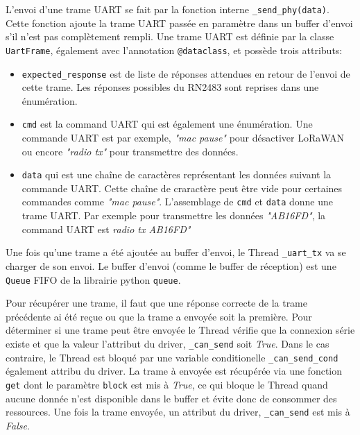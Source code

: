     L'envoi d'une trame UART se fait par la fonction interne \texttt{\_send\_phy(data)}. Cette fonction ajoute la trame UART passée en paramètre dans un buffer d'envoi s'il n'est pas complètement rempli. 
    Une trame UART est définie par la classe \texttt{UartFrame}, également avec l'annotation \texttt{@dataclass}, et possède trois attributs:
    \begin{itemize}
        \item \texttt{expected\_response} est de liste de réponses attendues en retour de l'envoi de cette trame. Les réponses possibles du RN2483 sont reprises dans une énumération. 
        \item \texttt{cmd} est la command UART qui est également une énumération. Une commande UART est par exemple, \textit{"mac pause"} pour désactiver LoRaWAN ou encore \textit{"radio tx"} pour transmettre des données.
        \item \texttt{data} qui est une chaîne de caractères représentant les données suivant la commande UART. Cette chaîne de craractère peut être vide pour certaines commandes comme \textit{"mac pause"}.
        L'assemblage de \texttt{cmd} et \texttt{data} donne une trame UART. Par exemple pour transmettre les données \textit{"AB16FD"}, la command UART est \textit{radio tx AB16FD"}
    \end{itemize}
    \vspace{0.5cm}

    Une fois qu'une trame a été ajoutée au buffer d'envoi, le Thread \texttt{\_uart\_tx} va se charger de 
    son envoi. Le buffer d'envoi (comme le buffer de réception) est une \texttt{Queue} FIFO de la librairie python \texttt{queue}.
    
    Pour récupérer une trame, il faut que une réponse correcte de la trame précédente ai été reçue ou que la trame a envoyée soit la première.
    Pour déterminer si une trame peut être envoyée le Thread vérifie que la connexion série existe 
    et que la valeur l'attribut du driver, \texttt{\_can\_send} soit \textit{True}. Dans le cas 
    contraire, le Thread est bloqué par une variable conditionelle \texttt{\_can\_send\_cond} également attribu du driver.
    La trame à envoyée est récupérée via une fonction \texttt{get} dont le paramètre \texttt{block} est 
    mis à \textit{True}, ce qui bloque le Thread quand aucune donnée n'est disponible dans le buffer et évite donc de consommer des ressources. Une fois la trame envoyée, un attribut du driver, \texttt{\_can\_send} est mis à \textit{False}.

